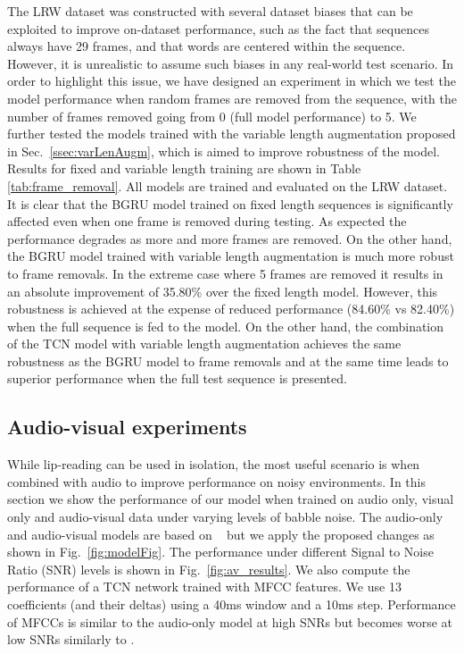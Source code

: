 \documentclass{article}
\begin{document}
The LRW dataset was constructed with several dataset biases that can be exploited to improve on-dataset performance, such as the fact that sequences always have 29 frames, and that words are centered within the sequence. However, it is unrealistic to assume such biases in any real-world test scenario. In order to highlight this issue, we have designed an experiment in which we test the model performance when random frames are removed from the sequence, with the number of frames removed  going from 0 (full model performance) to 5. We further tested the models trained with the variable length augmentation proposed in Sec.~\ref{ssec:varLenAugm}, which is aimed to improve robustness of the model. Results for fixed and variable length training are shown in Table \ref{tab:frame_removal}. All models are trained and evaluated on the LRW dataset. It is clear that the BGRU model trained on fixed length sequences is significantly affected even when one frame is removed during testing. As expected the performance degrades as more and more frames are removed. On the other hand, the BGRU model trained with variable length augmentation is much more robust to frame removals. In the extreme case where 5 frames are removed it results in an absolute improvement of 35.80\% over the fixed length model. However, this robustness is achieved at the expense of reduced performance (84.60\% vs 82.40\%) when the full sequence is fed to the model. On the other hand, the combination of the TCN model with variable length augmentation achieves the same robustness as the BGRU model to frame removals and at the same time leads to superior performance when the full test sequence is presented.  





\subsection{Audio-visual experiments}

While lip-reading can be used in isolation, the most useful scenario is when combined with audio to improve performance on noisy environments. In this section we show the performance of our model when trained on audio only, visual only and audio-visual data under varying levels of babble noise. The audio-only and audio-visual models are based on ~\cite{petridis18} but we apply the proposed changes as shown in Fig.~\ref{fig:modelFig}. The performance under different Signal to Noise Ratio (SNR) levels is shown in Fig.~\ref{fig:av_results}. We also compute the performance of a TCN network trained with MFCC features. We use 13 coefficients (and their deltas) using a 40ms window and a 10ms step. Performance of MFCCs is similar to the audio-only model at high SNRs but becomes worse at low SNRs similarly to \cite{petridis18}.
\end{document}
